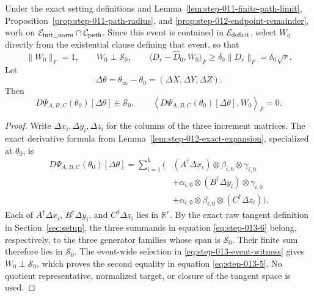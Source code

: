 \begin{lemma}
\label{lem:step-013-tangent-cancellation}
Under the exact setting definitions and
Lemma~\ref{lem:step-011-finite-path-limit},
Proposition~\ref{prop:step-011-path-radius}, and
\ref{prop:step-012-endpoint-remainder}, work on
\(\mathcal E_{\rm init\_norm}\cap\mathcal C_{\rm path}\). Since this event
is contained in \(\mathcal E_{\rm deficit}\), select \(W_0\) directly from
the existential clause defining that event, so that
\begin{equation}
  \|W_0\|_F=1,\qquad W_0\perp\mathscr S_0,\qquad
  \langle D_r-\widehat D_0,W_0\rangle_F
  \ge\delta_0\|D_r\|_F=\delta_0\sqrt r.
  \label{eq:step-013-event-witness}
\end{equation}
Let
\[
  \Delta\theta=\theta_\infty-\theta_0
  =(\Delta X,\Delta Y,\Delta Z).
\]
Then
\begin{equation}
  D\Psi_{A,B,C}(\theta_0)[\Delta\theta]\in\mathscr S_0,
  \qquad
  \left\langle D\Psi_{A,B,C}(\theta_0)[\Delta\theta],W_0\right\rangle_F=0.
  \label{eq:step-013-5}
\end{equation}

\end{lemma}

\begin{proof}
Write \(\Delta x_i,\Delta y_i,\Delta z_i\) for
the columns of the three increment matrices. The exact derivative formula
from Lemma~\ref{lem:step-012-exact-expansion}, specialized at
\(\theta_0\), is
\begin{equation}
\begin{aligned}
  D\Psi_{A,B,C}(\theta_0)[\Delta\theta]
  =\sum_{i=1}^k\bigl(&
    (A^\dagger\Delta x_i)\otimes\beta_{i,0}\otimes\gamma_{i,0}\\
    &+\alpha_{i,0}\otimes(B^\dagger\Delta y_i)\otimes\gamma_{i,0}\\
    &+\alpha_{i,0}\otimes\beta_{i,0}\otimes(C^\dagger\Delta z_i)
  \bigr).
\end{aligned}\label{eq:step-013-6}
\end{equation}
Each of \(A^\dagger\Delta x_i\), \(B^\dagger\Delta y_i\), and
\(C^\dagger\Delta z_i\) lies in \(\mathbb R^r\). By the exact raw tangent
definition in Section~\ref{sec:setup}, the three summands in equation \eqref{eq:step-013-6} belong,
respectively, to the three generator families whose span is
\(\mathscr S_0\). Their finite sum therefore lies in \(\mathscr S_0\).
The event-wide selection in
\eqref{eq:step-013-event-witness} gives
\(W_0\perp\mathscr S_0\), which proves the second equality in equation \eqref{eq:step-013-5}.
No quotient representative, normalized target, or closure of the tangent
space is used. 

\end{proof}


